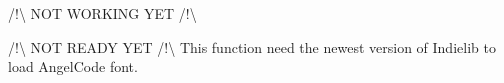 
\begin{DoxyRefList}
\item[\label{bug__bug000001}%
\hypertarget{bug__bug000001}{}%
Member \hyperlink{class_symp_1_1_button_a44df5d198c51903edec0ed94ef494674}{Symp\-:\-:Button\-:\-:set\-Text} (std\-::string text)]/!\textbackslash{} N\-O\-T W\-O\-R\-K\-I\-N\-G Y\-E\-T /!\textbackslash{}  
\item[\label{bug__bug000002}%
\hypertarget{bug__bug000002}{}%
Member \hyperlink{class_symp_1_1_gui_component_a1f8ff56c174ae9f4c32b31a0ed1a53b9}{Symp\-:\-:Gui\-Component\-:\-:load\-Font} ()]/!\textbackslash{} N\-O\-T R\-E\-A\-D\-Y Y\-E\-T /!\textbackslash{} This function need the newest version of Indielib to load Angel\-Code font. 
\end{DoxyRefList}